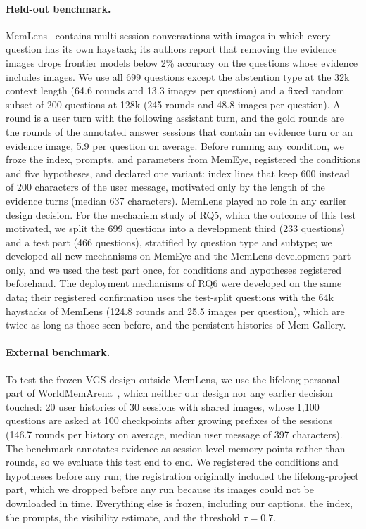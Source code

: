 \paragraph{Held-out benchmark.} MemLens~\citep{ren2026memlens} contains multi-session conversations with images in which every question has its own haystack; its authors report that removing the evidence images drops frontier models below 2\% accuracy on the questions whose evidence includes images. We use all 699 questions except the abstention type at the 32k context length (64.6 rounds and 13.3 images per question) and a fixed random subset of 200 questions at 128k (245 rounds and 48.8 images per question). A round is a user turn with the following assistant turn, and the gold rounds are the rounds of the annotated answer sessions that contain an evidence turn or an evidence image, 5.9 per question on average. Before running any condition, we froze the index, prompts, and parameters from MemEye, registered the conditions and five hypotheses, and declared one variant: index lines that keep 600 instead of 200 characters of the user message, motivated only by the length of the evidence turns (median 637 characters). MemLens played no role in any earlier design decision. For the mechanism study of RQ5, which the outcome of this test motivated, we split the 699 questions into a development third (233 questions) and a test part (466 questions), stratified by question type and subtype; we developed all new mechanisms on MemEye and the MemLens development part only, and we used the test part once, for conditions and hypotheses registered beforehand. The deployment mechanisms of RQ6 were developed on the same data; their registered confirmation uses the test-split questions with the 64k haystacks of MemLens (124.8 rounds and 25.5 images per question), which are twice as long as those seen before, and the persistent histories of Mem-Gallery.

\paragraph{External benchmark.} To test the frozen VGS design outside MemLens, we use the lifelong-personal part of WorldMemArena~\citep{liu2026worldmemarena}, which neither our design nor any earlier decision touched: 20 user histories of 30 sessions with shared images, whose 1,100 questions are asked at 100 checkpoints after growing prefixes of the sessions (146.7 rounds per history on average, median user message of 397 characters). The benchmark annotates evidence as session-level memory points rather than rounds, so we evaluate this test end to end. We registered the conditions and hypotheses before any run; the registration originally included the lifelong-project part, which we dropped before any run because its images could not be downloaded in time. Everything else is frozen, including our captions, the index, the prompts, the visibility estimate, and the threshold $\tau{=}0.7$.

